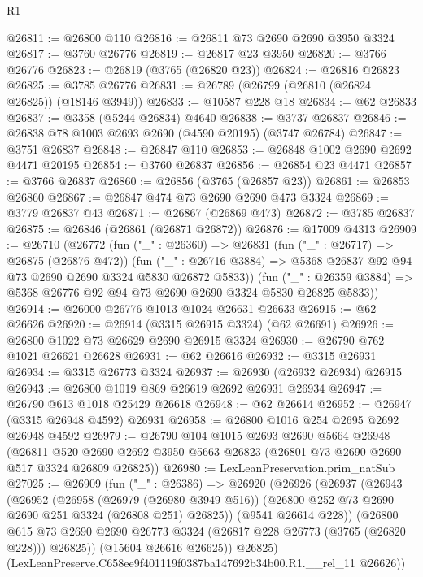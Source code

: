 \begin{lexlean}{R1}
\begin{coremodule}
@26811 := @26800 @110
@26816 := @26811 @73 @2690 @2690 @3950 @3324
@26817 := @3760 @26776
@26819 := @26817 @23 @3950
@26820 := @3766 @26776
@26823 := @26819 (@3765 (@26820 @23))
@26824 := @26816 @26823
@26825 := @3785 @26776
@26831 := @26789 (@26799 (@26810 (@26824 @26825)) (@18146 @3949))
@26833 := @10587 @228 @18
@26834 := @62 @26833
@26837 := @3358 (@5244 @26834) @4640
@26838 := @3737 @26837
@26846 := @26838 @78 @1003 @2693 @2690 (@4590 @20195) (@3747 @26784)
@26847 := @3751 @26837
@26848 := @26847 @110
@26853 := @26848 @1002 @2690 @2692 @4471 @20195
@26854 := @3760 @26837
@26856 := @26854 @23 @4471
@26857 := @3766 @26837
@26860 := @26856 (@3765 (@26857 @23))
@26861 := @26853 @26860
@26867 := @26847 @474 @73 @2690 @2690 @473 @3324
@26869 := @3779 @26837 @43
@26871 := @26867 (@26869 @473)
@26872 := @3785 @26837
@26875 := @26846 (@26861 (@26871 @26872))
@26876 := @17009 @4313
@26909 := @26710
    (@26772
      (fun ("_" : @26360) =>
      @26831
        (fun ("_" : @26717) => @26875 (@26876 @472))
        (fun ("_" : @26716 @3884) => @5368 @26837 @92 @94 @73 @2690 @2690 @3324 @5830 @26872 @5833))
      (fun ("_" : @26359 @3884) => @5368 @26776 @92 @94 @73 @2690 @2690 @3324 @5830 @26825 @5833))
@26914 := @26000 @26776 @1013 @1024 @26631 @26633
@26915 := @62 @26626
@26920 := @26914 (@3315 @26915 @3324) (@62 @26691)
@26926 := @26800 @1022 @73 @26629 @2690 @26915 @3324
@26930 := @26790 @762 @1021 @26621 @26628
@26931 := @62 @26616
@26932 := @3315 @26931
@26934 := @3315 @26773 @3324
@26937 := @26930 (@26932 @26934) @26915
@26943 := @26800 @1019 @869 @26619 @2692 @26931 @26934
@26947 := @26790 @613 @1018 @25429 @26618
@26948 := @62 @26614
@26952 := @26947 (@3315 @26948 @4592) @26931
@26958 := @26800 @1016 @254 @2695 @2692 @26948 @4592
@26979 := @26790
    @104
    @1015
    @2693
    @2690
    @5664
    @26948
    (@26811 @520 @2690 @2692 @3950 @5663 @26823 (@26801 @73 @2690 @2690 @517 @3324 @26809 @26825))
@26980 := LexLeanPreservation.prim_natSub
@27025 := @26909
    (fun ("_" : @26386) =>
    @26920
      (@26926
        (@26937
          (@26943
            (@26952
              (@26958
                (@26979 (@26980 @3949 @516))
                (@26800 @252 @73 @2690 @2690 @251 @3324 (@26808 @251) @26825))
              (@9541 @26614 @228))
            (@26800
              @615
              @73
              @2690
              @2690
              @26773
              @3324
              (@26817 @228 @26773 (@3765 (@26820 @228)))
              @26825))
          (@15604 @26616 @26625))
        @26825)
      (LexLeanPreserve.C658ee9f401119f0387ba147692b34b00.R1.__rel_11 @26626))

\end{coremodule}
\end{lexlean}
